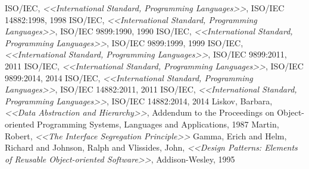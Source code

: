 \documentclass[a4paper,12pt,oneside]{article}
\begin{document}
\begin{thebibliography}{99}
 ISO/IEC, \textit{<<International Standard, Programming Languages>>}, ISO/IEC 14882:1998, 1998
 ISO/IEC, \textit{<<International Standard, Programming Languages>>}, ISO/IEC 9899:1990, 1990
 ISO/IEC, \textit{<<International Standard, Programming Languages>>}, ISO/IEC 9899:1999, 1999
 ISO/IEC, \textit{<<International Standard, Programming Languages>>}, ISO/IEC 9899:2011, 2011
 ISO/IEC, \textit{<<International Standard, Programming Languages>>}, ISO/IEC 9899:2014, 2014
 ISO/IEC, \textit{<<International Standard, Programming Languages>>}, ISO/IEC 14882:2011, 2011
 ISO/IEC, \textit{<<International Standard, Programming Languages>>}, ISO/IEC 14882:2014, 2014
 Liskov, Barbara, \textit{<<Data Abstraction and Hierarchy>>}, Addendum to the Proceedings on Object-oriented Programming Systems, Languages and Applications, 1987
 Martin, Robert, \textit{<<The Interface Segregation Principle>>}
 Gamma, Erich and Helm, Richard and Johnson, Ralph and Vlissides, John, \textit{<<Design Patterns: Elements of Reusable Object-oriented Software>>}, Addison-Wesley, 1995
\end{thebibliography}

\pagebreak
{}
\printindex
\end{document}

